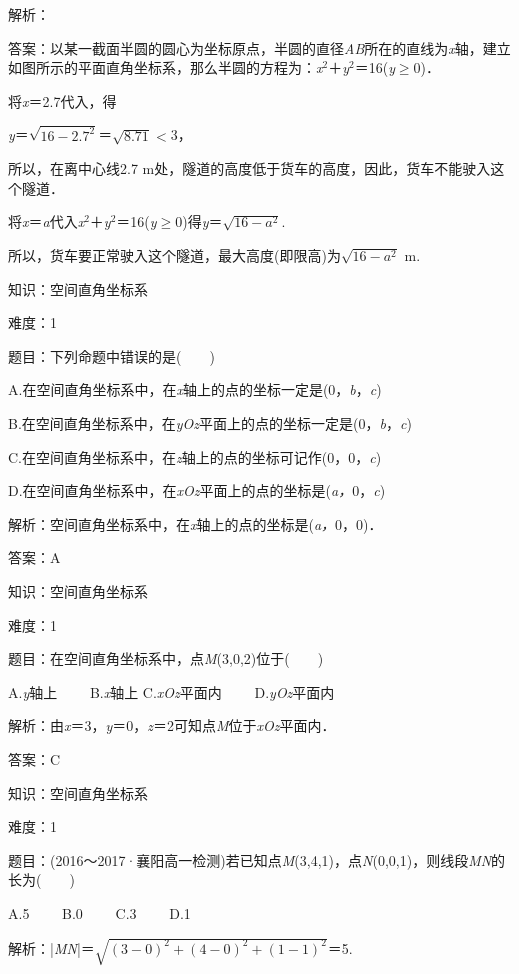 \documentclass{article} %
\begin{document}
解析：

答案：以某一截面半圆的圆心为坐标原点，半圆的直径\textit{AB}所在的直线为\textit{x}轴，建立如图所示的平面直角坐标系，那么半圆的方程为：\textit{x}${}^{2}$＋\textit{y}${}^{2}$＝16(\textit{y}$\mathrm{\ge}$0)．

将\textit{x}＝2.7代入，得

\textit{y}＝$\sqrt{16-2.7^2}$＝$\sqrt{8.71}$$\mathrm{<}$3，

所以，在离中心线2.7 m处，隧道的高度低于货车的高度，因此，货车不能驶入这个隧道．

将\textit{x}＝\textit{a}代入\textit{x}${}^{2}$＋\textit{y}${}^{2}$＝16(\textit{y}$\mathrm{\ge}$0)得\textit{y}＝$\sqrt{16-a^2}$.

所以，货车要正常驶入这个隧道，最大高度(即限高)为$\sqrt{16-a^2}$ m.

知识：空间直角坐标系

难度：1

题目：下列命题中错误的是(　　)

A.在空间直角坐标系中，在\textit{x}轴上的点的坐标一定是(0，\textit{b}，\textit{c})

B.在空间直角坐标系中，在\textit{yOz}平面上的点的坐标一定是(0，\textit{b}，\textit{c})

C.在空间直角坐标系中，在\textit{z}轴上的点的坐标可记作(0，0，\textit{c})

D.在空间直角坐标系中，在\textit{xOz}平面上的点的坐标是(\textit{a，}0，\textit{c})

解析：空间直角坐标系中，在\textit{x}轴上的点的坐标是(\textit{a，}0，0)．

答案：A

知识：空间直角坐标系

难度：1

题目：在空间直角坐标系中，点\textit{M}(3,0,2)位于(　　)

A.\textit{y}轴上　　 B.\textit{x}轴上 C.\textit{xOz}平面内　　 D.\textit{yOz}平面内

解析：由\textit{x}＝3，\textit{y}＝0，\textit{z}＝2可知点\textit{M}位于\textit{xOz}平面内．

答案：C

知识：空间直角坐标系

难度：1

题目：(2016～2017·襄阳高一检测)若已知点\textit{M}(3,4,1)，点\textit{N}(0,0,1)，则线段\textit{MN}的长为(　　)

A.5　　 B.0　　 C.3　　 D.1

解析：|\textit{MN}|＝$\sqrt{(3-0)^2+(4-0)^2+(1-1)^2}$＝5.
\end{document}
